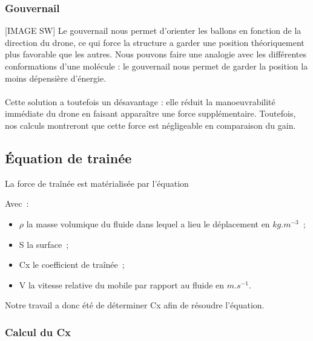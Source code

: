 \documentclass[a4paper,11pt]{article}
\begin{document}
\subsubsection{Gouvernail}
	[IMAGE SW]
	Le gouvernail nous permet d'orienter les ballons en fonction de la direction du drone, ce qui force la structure a garder une position théoriquement plus favorable que les autres.
	Nous pouvons faire une analogie avec les différentes conformations d'une molécule : le gouvernail nous permet de garder la position la moins dépensière d'énergie.\\
	\\
  Cette solution a toutefois un désavantage : elle réduit la manoeuvrabilité immédiate du drone en faisant apparaître une force supplémentaire. Toutefois, nos calculs montreront que cette force est négligeable en comparaison du gain.
\subsection{Équation de trainée}
	La force de traînée est matérialisée par l'équation\\
  \begin{center}
  \end{center}
  Avec~:
  \begin{itemize}
   \item $\rho$ la masse volumique du fluide dans lequel a lieu le déplacement en $kg.m^{-3}$~;
   \item S la surface~;
   \item Cx le coefficient de traînée~;
   \item V la vitesse relative du mobile par rapport au fluide en $m.s^{-1}$.
  \end{itemize}

	Notre travail a donc été de déterminer Cx afin de résoudre l'équation.
\subsubsection{Calcul du Cx}
\end{document}
